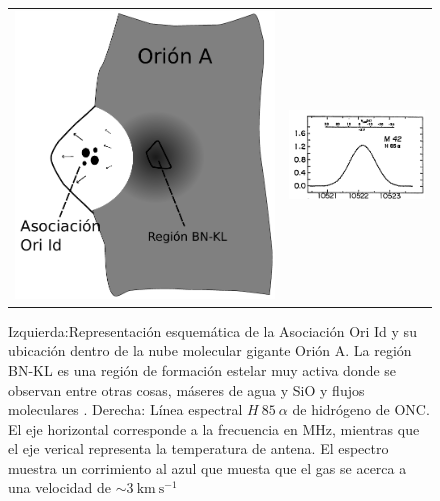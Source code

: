 \begin{figure}
  \begin{tabular}{lr}
    \includegraphics[width=0.4\linewidth]{./Figures/champagne} &
    \includegraphics[width=0.5\linewidth]{./Figures/H85-alpha}
    \end{tabular}
  \caption{Izquierda:Representación esquemática de la Asociación Ori Id y su ubicación dentro de la nube molecular gigante Orión A. La región BN-KL es una región de formación estelar muy activa donde se observan entre otras cosas, máseres de agua y SiO y flujos moleculares \citep{Stahler:2004}. Derecha: Línea espectral $H~85~\alpha$ de hidrógeno de ONC. El eje horizontal corresponde a la frecuencia en MHz, mientras que el eje verical representa la temperatura de antena. El espectro muestra un corrimiento al azul que muesta que el gas se acerca a una velocidad de $\sim 3\mathrm{~km~s^{-1}}$ \citep{Stahler:2004, Churchwell:1970}}
  \label{fig:champagne}
\end{figure}



